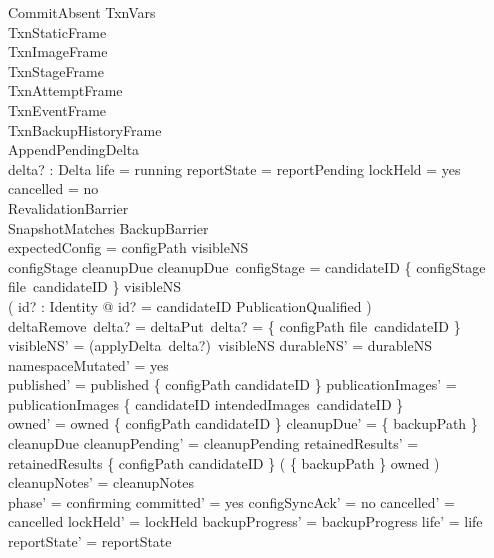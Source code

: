 \documentclass{article}
\begin{document}
\begin{schema}{CommitAbsent}
	\Delta TxnVars \\
	TxnStaticFrame \\
	TxnImageFrame \\
	TxnStageFrame \\
	TxnAttemptFrame \\
	TxnEventFrame \\
	TxnBackupHistoryFrame \\
	AppendPendingDelta \\
	delta? : Delta
	\where
	life = running \land reportState = reportPending \land lockHeld = yes \land
	cancelled = no \\
	RevalidationBarrier \\
	SnapshotMatches \land BackupBarrier \\
	expectedConfig = \emptyset \land configPath \notin \dom visibleNS \\
	configStage \in \dom cleanupDue \land cleanupDue~configStage = candidateID \land
	\{ configStage \mapsto file~candidateID \} \subseteq visibleNS \\
	( \exists id? : Identity @ id? = candidateID \land PublicationQualified ) \\
	deltaRemove~delta? = \emptyset \land
	deltaPut~delta? = \{ configPath \mapsto file~candidateID \} \\
	visibleNS' = (applyDelta~delta?)~visibleNS \land durableNS' = durableNS \land
	namespaceMutated' = yes \\
	published' = published \cup \{ configPath \mapsto candidateID \} \land
	publicationImages' = publicationImages \oplus
	\{ candidateID \mapsto intendedImages~candidateID \} \\
	owned' = owned \oplus \{ configPath \mapsto candidateID \} \land
	cleanupDue' = \{ backupPath \} \ndres cleanupDue \land
	cleanupPending' = cleanupPending \land
	retainedResults' = retainedResults \oplus \{ configPath \mapsto candidateID \}
	\oplus ( \{ backupPath \} \dres owned ) \land cleanupNotes' = cleanupNotes \\
	phase' = confirming \land committed' = yes \land configSyncAck' = no \land
	cancelled' = cancelled \land lockHeld' = lockHeld \land
	backupProgress' = backupProgress \land life' = life \land
	reportState' = reportState
\end{schema}
\end{document}
